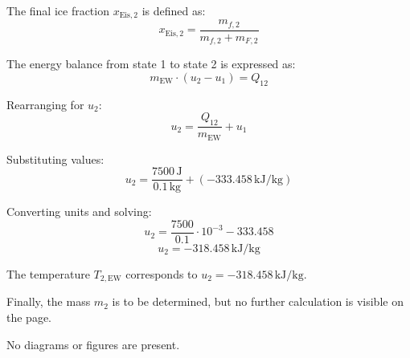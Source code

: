 The final ice fraction \( x_{\text{Eis},2} \) is defined as:
\[
x_{\text{Eis},2} = \frac{m_{f,2}}{m_{f,2} + m_{F,2}}
\]

The energy balance from state 1 to state 2 is expressed as:
\[
m_{\text{EW}} \cdot (u_2 - u_1) = Q_{12}
\]

Rearranging for \( u_2 \):
\[
u_2 = \frac{Q_{12}}{m_{\text{EW}}} + u_1
\]

Substituting values:
\[
u_2 = \frac{7500 \, \text{J}}{0.1 \, \text{kg}} + (-333.458 \, \text{kJ/kg})
\]

Converting units and solving:
\[
u_2 = \frac{7500}{0.1} \cdot 10^{-3} - 333.458
\]
\[
u_2 = -318.458 \, \text{kJ/kg}
\]

The temperature \( T_{2,\text{EW}} \) corresponds to \( u_2 = -318.458 \, \text{kJ/kg} \).

Finally, the mass \( m_2 \) is to be determined, but no further calculation is visible on the page.

No diagrams or figures are present.